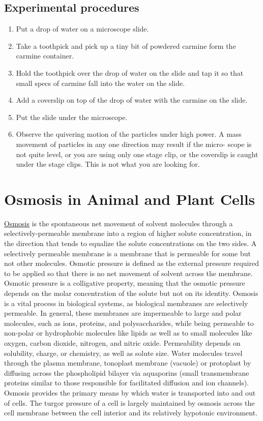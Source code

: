 \subsection{Experimental procedures}\label{experimental-procedures-17}

\begin{enumerate}
\def\labelenumi{\arabic{enumi}.}
\tightlist
\item
  Put a drop of water on a microscope slide.
\item
  Take a toothpick and pick up a tiny bit of powdered carmine form the
  carmine container.
\item
  Hold the toothpick over the drop of water on the slide and tap it so
  that small specs of carmine fall into the water on the slide.
\item
  Add a coverslip on top of the drop of water with the carmine on the
  slide.
\item
  Put the slide under the microscope.
\item
  Observe the quivering motion of the particles under high power. A mass
  movement of particles in any one direction may result if the micro-
  scope is not quite level, or you are using only one stage clip, or the
  coverslip is caught under the stage clips. This is not what you are
  looking for.
\end{enumerate}

\section{Osmosis in Animal and Plant
Cells}\label{osmosis-in-animal-and-plant-cells}

\href{https://en.wikipedia.org/wiki/Osmosis}{Osmosis} is the spontaneous
net movement of solvent molecules through a selectively-permeable
membrane into a region of higher solute concentration, in the direction
that tends to equalize the solute concentrations on the two sides. A
selectively permeable membrane is a membrane that is permeable for some
but not other molecules. Osmotic pressure is defined as the external
pressure required to be applied so that there is no net movement of
solvent across the membrane. Osmotic pressure is a colligative property,
meaning that the osmotic pressure depends on the molar concentration of
the solute but not on its identity. Osmosis is a vital process in
biological systems, as biological membranes are selectively permeable.
In general, these membranes are impermeable to large and polar
molecules, such as ions, proteins, and polysaccharides, while being
permeable to non-polar or hydrophobic molecules like lipids as well as
to small molecules like oxygen, carbon dioxide, nitrogen, and nitric
oxide. Permeability depends on solubility, charge, or chemistry, as well
as solute size. Water molecules travel through the plasma membrane,
tonoplast membrane (vacuole) or protoplast by diffusing across the
phospholipid bilayer via aquaporins (small transmembrane proteins
similar to those responsible for facilitated diffusion and ion
channels). Osmosis provides the primary means by which water is
transported into and out of cells. The turgor pressure of a cell is
largely maintained by osmosis across the cell membrane between the cell
interior and its relatively hypotonic environment.

